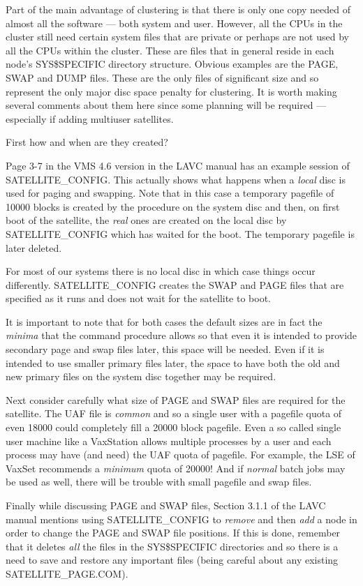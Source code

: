 Part of the main advantage of clustering is that there is only one copy needed
of almost all the software --- both system and user.
However, all the CPUs in the cluster still need certain system files that are
private or perhaps are not used by all the CPUs within the cluster.
These are files that in general reside in each node's SYS\$SPECIFIC directory
structure.
Obvious examples are the PAGE, SWAP and DUMP files.
These are the only files of significant size and so represent the only major
disc space penalty for clustering.
It is worth making several comments about them here since some planning
will be required --- especially if adding multiuser satellites.

First how and when are they created?

Page 3-7 in the VMS 4.6 version in the LAVC manual has an example session of
SATELLITE\_CONFIG.
This actually shows what happens when a {\em local} disc is used for paging
and swapping.
Note that in this case a temporary pagefile of 10000 blocks is created by the
procedure on the system disc and then, on first boot of the satellite, the
{\em real } ones are created on the local disc by SATELLITE\_CONFIG which has
waited for the boot.
The temporary pagefile is later deleted.

For most of our systems there is no local disc in which case things occur
differently.
SATELLITE\_CONFIG creates the SWAP and PAGE files that are specified as it
runs and does not wait for the satellite to boot.

It is important to note that for both cases the default sizes are in fact the
{\em minima} that the command procedure allows so that even it is intended to
provide secondary page and swap files later, this space will be needed.
Even if it is intended to use smaller primary files later, the space to have
both the old and new primary files on the system disc together may be required.

Next consider carefully what size of PAGE and SWAP files are required for
the satellite.
The UAF file is {\em common} and so a single user with a pagefile quota of even
18000 could completely fill a 20000 block pagefile.
Even a so called single user machine like a VaxStation allows multiple processes
by a user and each process may have (and need) the UAF quota of pagefile.
For example, the LSE of VaxSet recommends a {\em minimum} quota of 20000!
And if {\em normal} batch jobs may be used as well, there will be trouble with
small pagefile and swap files.

Finally while discussing PAGE and SWAP files, Section 3.1.1 of the LAVC manual
mentions using SATELLITE\_CONFIG to {\em remove} and then {\em add} a node in
order to change the PAGE and SWAP file positions.
If this is done, remember that it deletes {\em all} the files in the
SYS\$SPECIFIC directories and so there is a need to save and restore any
important files (being careful about any existing SATELLITE\_PAGE.COM).

